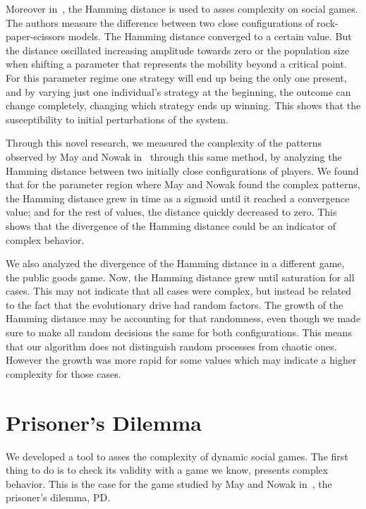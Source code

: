 Moreover in~\cite{HammingChaos1,HammingChaos2}, the Hamming distance is used to asses complexity on social games. The authors measure the difference between two close configurations of rock-paper-scissors models. The Hamming distance converged to a certain value. But the distance oscillated increasing amplitude towards zero or the population size when shifting a parameter that represents the mobility beyond a critical point. For this parameter regime one strategy will end up being the only one present, and by varying just one individual's strategy at the beginning, the outcome can change completely, changing which strategy ends up winning.  This shows that the susceptibility to  initial perturbations of the system. 

Through this novel research, we measured the complexity of the patterns observed by May and Nowak in~\cite{SpatialChaos} through this same method, by analyzing the Hamming distance between two initially close configurations of players. We found that for the parameter region where May and Nowak found the complex patterns, the Hamming distance grew in time as a sigmoid until it reached a convergence value; and for the rest of values, the distance quickly decreased to zero. This shows that the divergence of the Hamming distance could be an indicator of complex behavior. 

We also analyzed the divergence of the Hamming distance in a different game, the public goods game. Now, the Hamming distance grew until saturation for all cases. This may not indicate that all cases were complex, but instead be related to the fact that the evolutionary drive had random factors. The growth of the Hamming distance may be accounting for that randomness, even though we made sure to make all random decisions the same for both configurations. This means that our algorithm does not distinguish random processes from chaotic ones. However the growth was more rapid for some values which may indicate a higher complexity for those cases.


\section{Prisoner's Dilemma}

We developed a tool to asses the complexity of dynamic social games. The first thing to do is to check its validity with a game we know, presents complex behavior. This is the case for the game studied by May and Nowak in~\cite{SpatialChaos}, the prisoner's dilemma, PD. 

